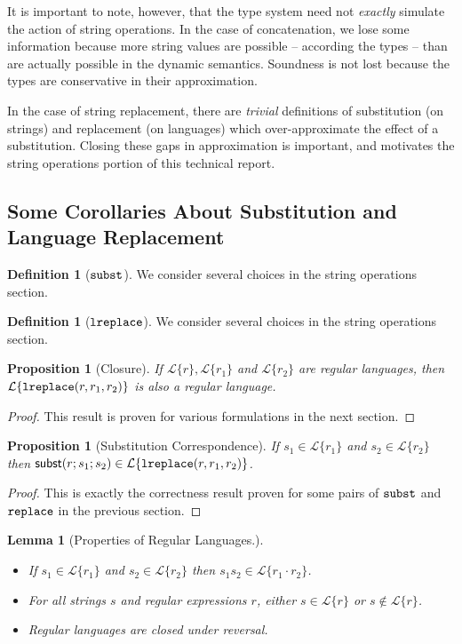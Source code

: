 \documentclass[12pt]{article}
\newtheorem{lem}[thm]{Lemma}
\newtheorem{prop}[thm]{Proposition}
\theoremstyle{definition}
\newtheorem{defn}[thm]{Definition}
\newcommand{\Lagr}{\mathcal{L}}
\newcommand{\lang}[1]{\Lagr\{#1\}}
\newcommand{\lsubst}[3]{{\sf subst}(#1;#2;#3)} %
\newcommand{\lreplace}[3]{{\sf lreplace}(#1; #2; #3)}
\renewcommand{\lreplace}[3]{{\tt lreplace}(#1, #2, #3)}
\begin{document}
It is important to note, however, that the type system need not \emph{exactly} simulate the action of string operations.
In the case of concatenation, we lose some information because more string values are possible -- according the types --
than are actually possible in the dynamic semantics.
Soundness is not lost because the types are conservative in their approximation.

In the case of string replacement, there are \emph{trivial} definitions of substitution (on strings) and replacement (on languages) which over-approximate 
the effect of a substitution. Closing these gaps in approximation is important, and motivates the string operations portion of this technical report.

\subsection{Some Corollaries About Substitution and Language Replacement}

\begin{defn}[$\tt{subst}$]
We consider several choices in the string operations section.
\end{defn}

\begin{defn}[$\tt{lreplace}$]
We consider several choices in the string operations section.
\end{defn}

\begin{prop}[Closure] \label{thm:total}
  If $\lang{r}, \lang{r_1}$ and $\lang{r_2}$ are regular languages, then $\lang{\lreplace{r}{r_1}{r_2}}$ is also a regular language.
\end{prop}
\begin{proof}
This result is proven for various formulations in the next section.
\end{proof}

\begin{prop}[Substitution Correspondence] \label{thm:substcorrespondence}
  If $s_1 \in \lang{r_1}$ and $s_2 \in \lang{r_2}$ then $\lsubst{r}{s_1}{s_2} \in \lang{\lreplace{r}{r_1}{r_2}}$.
\end{prop}
\begin{proof}
This is exactly the correctness result proven for some pairs of ${\tt subst}$ and ${\tt replace}$ in the previous section.
\end{proof}

\begin{lem}[Properties of Regular Languages.] \label{thm:regexprops}
~
\begin{itemize}

\item If $s_1 \in \lang{r_1}$ and $s_2 \in \lang{r_2}$ then $s_1s_2 \in \lang{r_1\cdot r_2}$.
\item For all strings $s$ and regular expressions $r$, either $s \in \lang{r}$ or $s \not \in \lang{r}$.
\item Regular languages are closed under reversal.
\end{itemize}
\end{lem}
\end{document}
